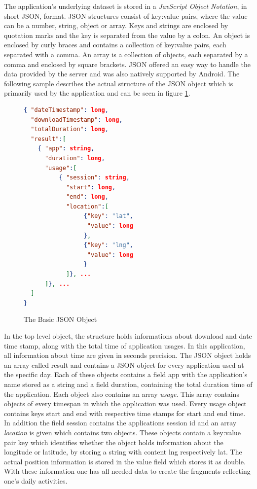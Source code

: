 The  application's underlying dataset is stored in a \emph{JavScript Object Notation}, in short JSON, format. JSON structures consist of  key:value pairs, where the value can be a number, string, object or array. Keys and strings are enclosed by quotation marks and the key is separated from the value by a colon. An object is enclosed by curly braces and contains a collection of key:value pairs, each separated with a comma. An array is a collection of objects, each separated by a comma and enclosed by square brackets. JSON offered an easy way to handle the data provided by the server and was also natively supported by Android. The following sample describes the actual structure of the JSON object which is primarily used by the application and can be seen in figure \ref{fig:jsonobject}.
\begin{figure}
\caption{The Basic JSON Object}
\label{fig:jsonobject}
\begin{lstlisting}[language=json,firstnumber=1]
{ "dateTimestamp": long,
  "downloadTimestamp": long,
  "totalDuration": long,
  "result":[
    { "app": string,
      "duration": long,
      "usage":[
          { "session": string,
            "start": long,
            "end": long,
            "location":[
                 {"key": "lat",
                  "value": long
                 },
                 {"key": "lng",
                  "value": long
                 }
            ]}, ...
      ]}, ...
  ]
}
\end{lstlisting}
\end{figure}

In  the top level object, the structure holds informations about download and date time stamp, along with the total time of application usages. In this application, all information about time are given in seconds precision. The JSON object holds an array called result and contains a JSON object for every application used at the specific day. Each of these objects contains a field app with the application's name stored as a string and a field duration, containing the total duration time of the application. Each object also contains an array \emph{usage}. This array contains objects of every timespan in which the application was used. Every usage object contains keys start and end with respective time stamps for start and end time. In addition the field session contains the applications session id and an array \emph{location} is given which contains two objects. These objects contain a key:value pair key which identifies whether the object holds information about the longitude or latitude, by storing a string with content lng respectively lat. The actual position information is stored in the value field which stores it as double.\\
With these information one has all needed data to create the fragments reflecting one's daily activities.

